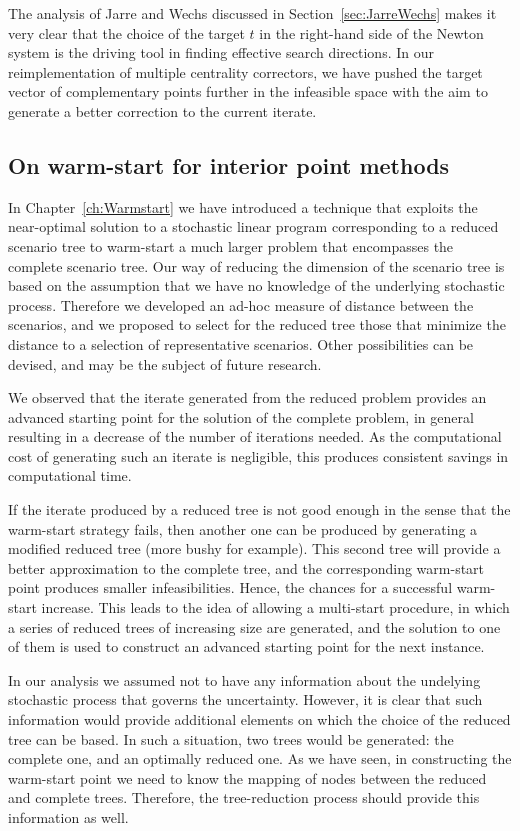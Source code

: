 The analysis of Jarre and Wechs discussed in Section~\ref{sec:JarreWechs}
makes it very clear that the choice of the target $t$ in
the right-hand side of the Newton system is the driving
tool in finding effective search directions.
In our reimplementation of multiple centrality correctors, we
have pushed the target vector of complementary points further
in the infeasible space with the aim to generate a better
correction to the current iterate.

%
%
\subsection*{On warm-start for interior point methods}

In Chapter~\ref{ch:Warmstart}
we have introduced a technique that exploits the near-optimal solution
to a stochastic linear program corresponding to a 
reduced scenario tree to warm-start a much larger problem 
that encompasses the complete scenario tree.
Our way of reducing the dimension of the scenario tree 
is based on the assumption that we have no knowledge 
of the underlying stochastic process. 
Therefore we developed an ad-hoc measure of distance 
between the scenarios, and we proposed to select for the 
reduced tree those that minimize the distance to 
a selection of representative scenarios. 
Other possibilities can be devised, and may be 
the subject of future research.

We observed that the iterate generated from the reduced problem
provides an advanced starting point for the solution of the complete problem,
in general resulting in a decrease of the number of iterations needed.
As the computational cost of generating such an iterate is negligible,
this produces consistent savings in computational time.

If the iterate produced by a reduced tree is not good enough 
in the sense that the warm-start strategy fails, then another one 
can be produced by generating a modified reduced tree (more 
bushy for example).
This second tree will provide a better approximation to the
complete tree, and the corresponding warm-start point produces
smaller infeasibilities. Hence, the chances for a successful 
warm-start increase.
This leads to the idea of allowing a multi-start procedure, in
which a series of reduced trees of increasing size are generated,
and the solution to one of them is used to construct an 
advanced starting point for the next instance.

In our analysis we assumed not to have any information about the
undelying stochastic process that governs the uncertainty.
However, it is clear that such information would provide additional
elements on which the choice of the reduced tree can be based.
In such a situation, two trees would be generated: the complete one,
and an optimally reduced one.
As we have seen, in constructing the warm-start point we need
to know the mapping of nodes between the reduced and complete trees.
Therefore, the tree-reduction process should provide this information
as well.

